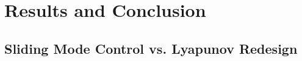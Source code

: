 \section{Results and Conclusion} %
\label{sec:results_and_conclusion}

\subsection{Sliding Mode Control vs. Lyapunov Redesign} %
\label{sub:sliding_mode_control_vs_lyapunov_redesign}


